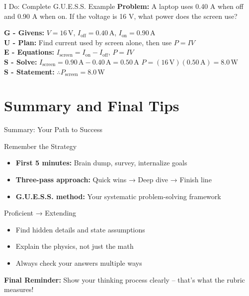 \documentclass{beamer}
\begin{document}
\begin{frame}{I Do: Complete G.U.E.S.S. Example}
\textbf{Problem:} A laptop uses 0.40 A when off and 0.90 A when on. If the voltage is 16 V, what power does the screen use?
\pause
\vspace{0.5cm}

\textbf{G - Givens:} $V = 16\,\text{V}$, $I_{\text{off}} = 0.40\,\text{A}$, $I_{\text{on}} = 0.90\,\text{A}$ \\
\pause
\textbf{U - Plan:} Find current used by screen alone, then use $P = IV$ \\
\pause
\textbf{E - Equations:} $I_{\text{screen}} = I_{\text{on}} - I_{\text{off}}$, $P = IV$ \\
\pause
\textbf{S - Solve:} 
$I_{\text{screen}} = 0.90\,\text{A} - 0.40\,\text{A} = 0.50\,\text{A}$
$P = (16\,\text{V})(0.50\,\text{A}) = 8.0\,\text{W}$ \\
\pause
\textbf{S - Statement:} $\boxed{\therefore P_{\text{screen}} = 8.0\,\text{W}}$
\end{frame}


\section{Summary and Final Tips}

\begin{frame}{Summary: Your Path to Success}
\begin{block}{Remember the Strategy}
\begin{itemize}
\item \textbf{First 5 minutes:} Brain dump, survey, internalize goals
\item \textbf{Three-pass approach:} Quick wins → Deep dive → Finish line
\item \textbf{G.U.E.S.S. method:} Your systematic problem-solving framework
\end{itemize}
\end{block}

\begin{block}{Proficient → Extending}
\begin{itemize}
\item Find hidden details and state assumptions
\item Explain the physics, not just the math
\item Always check your answers multiple ways
\end{itemize}
\end{block}

\textbf{Final Reminder:} Show your thinking process clearly – that's what the rubric measures!
\end{frame}
\end{document}
